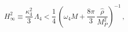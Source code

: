 \begin{equation}
H^2_\infty \equiv \frac{\kappa^2_4}{3}\,\Lambda_4 < \frac{1}{4}\,
\left(\omega_4 M + \frac{8 \pi}{3}\,\frac{\hat\rho}{M_P^2}\right)^{-1}\,,
\end{equation}

